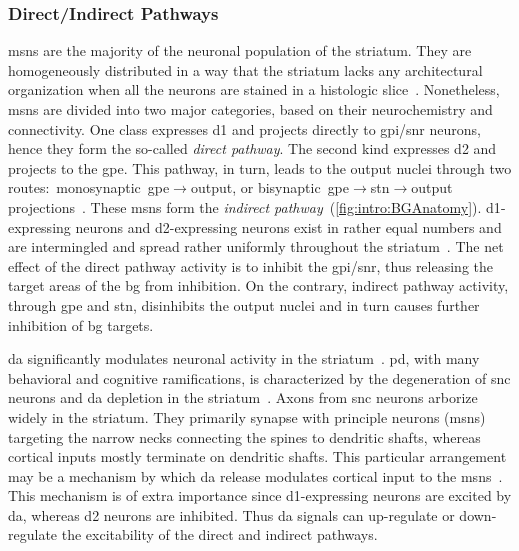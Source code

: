 \subsubsection{Direct/Indirect Pathways}
\label{intro:bg:pathways}
\Glspl{msn} are the majority of the neuronal population of the striatum.
They are homogeneously distributed in a way that the striatum lacks any architectural organization when all the neurons are stained in a histologic slice~\cite{Dudman2015Book}.
Nonetheless, \glspl{msn} are divided into two major categories, based on their neurochemistry and connectivity.
One class expresses \gls{d1} and projects directly to \gls{gpi}/\gls{snr} neurons, hence they form the so-called \emph{direct pathway}\!{}.
The second kind expresses \gls{d2} and projects to the \gls{gpe}.
This pathway, in turn, leads to the output nuclei through two routes:~monosynaptic~\gls{gpe}$\rightarrow$output, or bisynaptic~\gls{gpe}$\rightarrow$\gls{stn}$\rightarrow$output projections~\cite{TURNER2000BasalFunction}.
These \glspl{msn} form the \emph{indirect pathway}~(\autoref{fig:intro:BGAnatomy}).
\Gls{d1}-expressing neurons and \gls{d2}-expressing neurons exist in rather equal numbers and are intermingled and spread rather uniformly throughout the striatum~\cite{Dudman2015Book}.
The net effect of the direct pathway activity is to inhibit the \gls{gpi}/\gls{snr}, thus releasing the target areas of the \gls{bg} from inhibition.
On the contrary, indirect pathway activity, through \gls{gpe} and \gls{stn}, disinhibits the output nuclei and in turn causes further inhibition of \gls{bg} targets.
\par
\Gls{da} significantly modulates neuronal activity in the striatum~\cite{Panigrahi2015Cell}.
\Gls{pd}, with many behavioral and cognitive ramifications, is characterized by the degeneration of \gls{snc} neurons and \gls{da} depletion in the striatum~\cite[see][for a comprehensive review]{McGregor2019Neuron}.
Axons from \gls{snc} neurons arborize widely in the striatum.
They primarily synapse with principle neurons (\glspl{msn}) targeting the narrow necks connecting the spines to dendritic shafts, whereas cortical inputs mostly terminate on dendritic shafts.
This particular arrangement may be a mechanism by which \gls{da} release modulates cortical input to the \glspl{msn}~\cite{TURNER2000BasalFunction}.
This mechanism is of extra importance since \gls{d1}-expressing neurons are excited by \gls{da}, whereas \gls{d2} neurons are inhibited.
Thus \gls{da} signals can up-regulate or down-regulate the excitability of the direct and indirect pathways.



